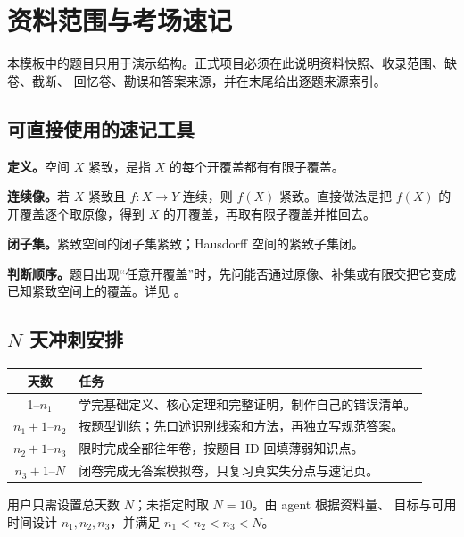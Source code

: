 \section{资料范围与考场速记}

\begin{warningbox}
本模板中的题目只用于演示结构。正式项目必须在此说明资料快照、收录范围、缺卷、截断、
回忆卷、勘误和答案来源，并在末尾给出逐题来源索引。
\end{warningbox}

\subsection{可直接使用的速记工具}

\begin{cheatbox}[title={紧致性与连续映射}]
\textbf{定义。}空间 \(X\) 紧致，是指 \(X\) 的每个开覆盖都有有限子覆盖。

\textbf{连续像。}若 \(X\) 紧致且 \(f:X\to Y\) 连续，则 \(f(X)\) 紧致。直接做法是把
\(f(X)\) 的开覆盖逐个取原像，得到 \(X\) 的开覆盖，再取有限子覆盖并推回去。

\textbf{闭子集。}紧致空间的闭子集紧致；Hausdorff 空间的紧致子集闭。

\textbf{判断顺序。}题目出现“任意开覆盖”时，先问能否通过原像、补集或有限交把它变成
已知紧致空间上的覆盖。详见
。
\end{cheatbox}

\subsection{\(N\) 天冲刺安排}

\noindent\begin{tabularx}{\textwidth}{@{}cX@{}}
\toprule
天数 & 任务 \\
\midrule
1--\(n_1\) & 学完基础定义、核心定理和完整证明，制作自己的错误清单。\\
\(n_1+1\)--\(n_2\) & 按题型训练；先口述识别线索和方法，再独立写规范答案。\\
\(n_2+1\)--\(n_3\) & 限时完成全部往年卷，按题目 ID 回填薄弱知识点。\\
\(n_3+1\)--\(N\) & 闭卷完成无答案模拟卷，只复习真实失分点与速记页。\\
\bottomrule
\end{tabularx}

\noindent 用户只需设置总天数 \(N\)；未指定时取 \(N=10\)。由 agent 根据资料量、
目标与可用时间设计 \(n_1,n_2,n_3\)，并满足 \(n_1<n_2<n_3<N\)。

